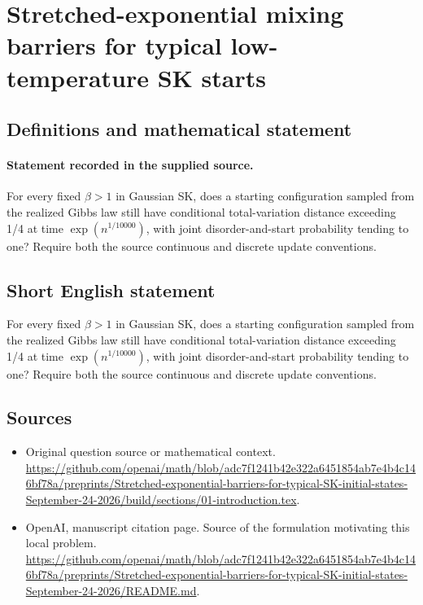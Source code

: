 \documentclass[11pt]{article}
\begin{document}
\section*{Stretched-exponential mixing barriers for typical low-temperature SK starts}\label{statement}
\subsection{Definitions and mathematical statement}
\paragraph{Statement recorded in the supplied source.}
For every fixed $\beta >1$ in Gaussian SK, does a starting configuration sampled from the realized Gibbs law still have conditional total-variation distance exceeding 1/4 at time $\exp (n^{1/10000})$, with joint disorder-and-start probability tending to one? Require both the source continuous and discrete update conventions.
\subsection{Short English statement}
For every fixed $\beta >1$ in Gaussian SK, does a starting configuration sampled from the realized Gibbs law still have conditional total-variation distance exceeding 1/4 at time $\exp (n^{1/10000})$, with joint disorder-and-start probability tending to one? Require both the source continuous and discrete update conventions.
\subsection{Sources}
\begin{itemize}
\item[S1] Original question source or mathematical context.
\url{https://github.com/openai/math/blob/adc7f1241b42e322a6451854ab7e4b4c146bf78a/preprints/Stretched-exponential-barriers-for-typical-SK-initial-states-September-24-2026/build/sections/01-introduction.tex}.
\item[S2] OpenAI, manuscript citation page. Source of the formulation motivating this local problem.
\url{https://github.com/openai/math/blob/adc7f1241b42e322a6451854ab7e4b4c146bf78a/preprints/Stretched-exponential-barriers-for-typical-SK-initial-states-September-24-2026/README.md}.
\end{itemize}
\end{document}
